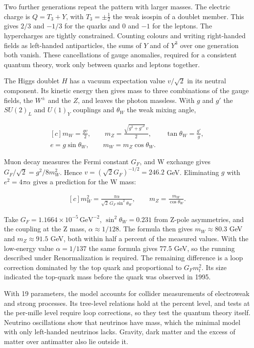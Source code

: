 \documentclass[11pt,oneside]{book}
\newenvironment{centeredalign}{\[\begin{gathered}[c]}{\end{gathered}\]}
\begin{document}
Two further generations repeat the pattern with larger masses. The electric charge is \(Q=T_3+Y\), with \(T_3=\pm\frac12\) the weak isospin of a doublet member. This gives \(2/3\) and \(-1/3\) for the quarks and \(0\) and \(-1\) for the leptons. The hypercharges are tightly constrained. Counting colours and writing right-handed fields as left-handed antiparticles, the sums of \(Y\) and of \(Y^3\) over one generation both vanish. These cancellations of gauge anomalies, required for a consistent quantum theory, work only between quarks and leptons together.

The Higgs doublet \(H\) has a vacuum expectation value \(v/\sqrt2\) in its neutral component. Its kinetic energy then gives mass to three combinations of the gauge fields, the \(W^\pm\) and the \(Z\), and leaves the photon massless. With \(g\) and \(g'\) the \(SU(2)_L\) and \(U(1)_Y\) couplings and \(\theta_W\) the weak mixing angle,

\begin{centeredalign}
m_W=\frac{gv}{2},\qquad m_Z=\frac{\sqrt{g^2+g'^2}\,v}{2},\qquad
\tan\theta_W=\frac{g'}{g},\\
e=g\sin\theta_W,\qquad m_W=m_Z\cos\theta_W.
\end{centeredalign}

Muon decay measures the Fermi constant \(G_F\), and W exchange gives \(G_F/\sqrt2=g^2/8m_W^2\). Hence \(v=(\sqrt2G_F)^{-1/2}=246.2\) GeV. Eliminating \(g\) with \(e^2=4\pi\alpha\) gives a prediction for the W mass:

\begin{centeredalign}
m_W^2=\frac{\pi\alpha}{\sqrt2\,G_F\sin^2\theta_W},\qquad
m_Z=\frac{m_W}{\cos\theta_W}.
\end{centeredalign}

Take \(G_F=1.1664\times10^{-5}\,\mathrm{GeV^{-2}}\), \(\sin^2\theta_W=0.231\) from Z-pole asymmetries, and the coupling at the Z mass, \(\alpha\approx1/128\). The formula then gives \(m_W\approx80.3\) GeV and \(m_Z\approx91.5\) GeV, both within half a percent of the measured values. With the low-energy value \(\alpha=1/137\) the same formula gives 77.5 GeV, so the running described under Renormalization is required. The remaining difference is a loop correction dominated by the top quark and proportional to \(G_Fm_t^2\). Its size indicated the top-quark mass before the quark was observed in 1995.

With 19 parameters, the model accounts for collider measurements of electroweak and strong processes. Its tree-level relations hold at the percent level, and tests at the per-mille level require loop corrections, so they test the quantum theory itself. Neutrino oscillations show that neutrinos have mass, which the minimal model with only left-handed neutrinos lacks. Gravity, dark matter and the excess of matter over antimatter also lie outside it.
\end{document}
